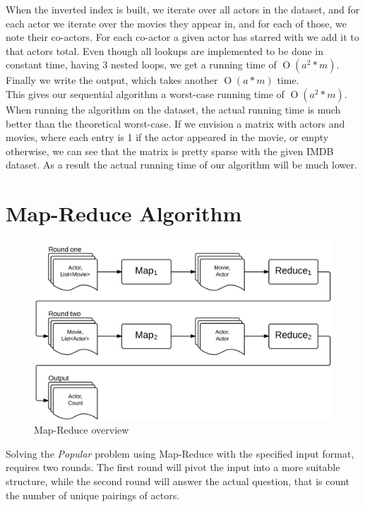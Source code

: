 \documentclass[a4paper,11pt]{article}
\newcommand{\BigO}[1]{\ensuremath{\operatorname{O}\left(#1\right)}}
\begin{document}
When the inverted index is built, we iterate over all actors in the dataset, and for each actor we iterate over the movies they appear in, and for each of those, we note their co-actors. For each co-actor a given actor has starred with we add it to that actors total. Even though all lookups are implemented to be done in constant time, having 3 nested loops, we get a running time of \BigO{a^2*m}. Finally we write the output, which takes another \BigO{a*m} time.\\

This gives our sequential algorithm a worst-case running time of \BigO{a^2*m}. When running the algorithm on the dataset, the actual running time is much better than the theoretical worst-case. If we envision a matrix with actors and movies, where each entry is 1 if the actor appeared in the movie, or empty otherwise, we can see that the matrix is pretty sparse with the given IMDB dataset. As a result the actual running time of our algorithm will be much lower.

\section{Map-Reduce Algorithm}
\label{sub:map-reduce}
\begin{figure}
\centering \includegraphics[scale=0.2]{map-reduce-figure.png}
\vspace{-10pt}
\caption{Map-Reduce overview}
\label{fig:map-reduce}
\vspace{-10pt}
\end{figure}

Solving the \emph{Popular} problem using Map-Reduce with the specified input format, requires two rounds. The first round will pivot the input into a more suitable structure, while the second round will answer the actual question, that is count the number of unique pairings of actors.
\end{document}
